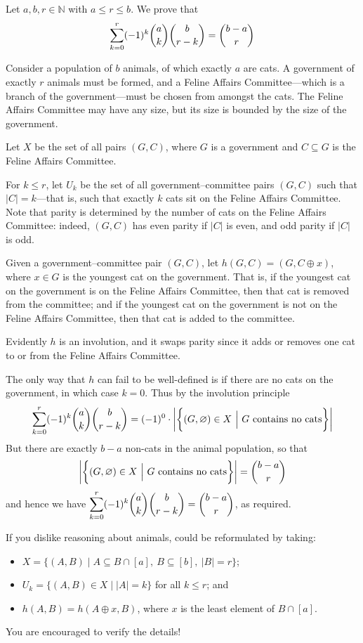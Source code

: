 \begin{example}
\label{exAlternatingSumCats}
Let $a,b,r \in \mathbb{N}$ with $a \le r \le b$. We prove that
\[ \sum_{k=0}^r (-1)^k \dbinom{a}{k} \dbinom{b}{r-k} = \dbinom{b-a}{r} \]

Consider a population of $b$ animals, of which exactly $a$ are cats. A government of exactly $r$ animals must be formed, and a Feline Affairs Committee---which is a branch of the government---must be chosen from amongst the cats. The Feline Affairs Committee may have any size, but its size is bounded by the size of the government.

Let $X$ be the set of all pairs $(G, C)$, where $G$ is a government and $C \subseteq G$ is the Feline Affairs Committee.

For $k \le r$, let $U_k$ be the set of all government--committee pairs $(G, C)$ such that $|C|=k$---that is, such that exactly $k$ cats sit on the Feline Affairs Committee. Note that parity is determined by the number of cats on the Feline Affairs Committee: indeed, $(G,C)$ has even parity if $|C|$ is even, and odd parity if $|C|$ is odd.

Given a government--committee pair $(G, C)$, let $h(G,C) = (G, C \oplus x)$, where $x \in G$ is the youngest cat on the government. That is, if the youngest cat on the government is on the Feline Affairs Committee, then that cat is removed from the committee; and if the youngest cat on the government is not on the Feline Affairs Committee, then that cat is added to the committee.

Evidently $h$ is an involution, and it swaps parity since it adds or removes one cat to or from the Feline Affairs Committee.

The only way that $h$ can fail to be well-defined is if there are no cats on the government, in which case $k=0$. Thus by the involution principle
\[ \sum_{k=0}^r (-1)^k \dbinom{a}{k} \dbinom{b}{r-k} = (-1)^0 \cdot \left| \bigg\{ (G,\varnothing) \in X ~\Big|~ G \text{ contains no cats} \bigg\} \right| \]
But there are exactly $b-a$ non-cats in the animal population, so that
\[ \left| \bigg\{ (G,\varnothing) \in X ~\Big|~ G \text{ contains no cats} \bigg\} \right| = \dbinom{b-a}{r} \]
and hence we have $\displaystyle\sum_{k=0}^r (-1)^k \dbinom{a}{k} \dbinom{b}{r-k} = \dbinom{b-a}{r}$, as required.
\end{example}

If you dislike reasoning about animals,  could be reformulated by taking:
\begin{itemize}
\item $X = \{ (A, B) \mid A \subseteq B \cap [a],~ B \subseteq [b],~ |B|=r \}$;
\item $U_k = \{ (A, B) \in X \mid |A| = k \}$ for all $k \le r$; and
\item $h(A,B) = h(A \oplus x, B)$, where $x$ is the least element of $B \cap [a]$.
\end{itemize}
You are encouraged to verify the details!

